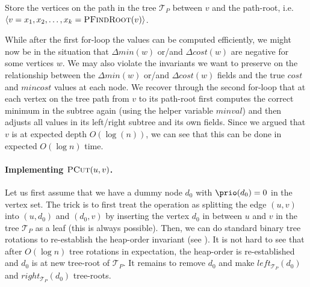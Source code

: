 \begin{algorithm}
  \SetAlgoLined
  \DontPrintSemicolon
  Store the vertices on the path in the tree $\mathcal{T}_{P}$ between $v$ and the path-root, i.e. $\langle v = x_1, x_2, \ldots, x_k = \textsc{PFindRoot}(v)\rangle$.\\
  
  \caption{$\textsc{PAddCost}(v, \Delta)$}
\end{algorithm}

While after the first for-loop the values can be computed efficiently, we might now be in the situation that $\Delta min(w)$ or/and $\Delta cost(w)$ are negative for some vertices $w$. We may also  violate the invariants we want to preserve on the relationship between the $\Delta min(w)$ or/and $\Delta cost(w)$ fields and the true $cost$ and $mincost$ values at each node. We recover through the second for-loop that at each vertex on the tree path from $v$ to its path-root first computes the correct minimum in the subtree again (using the helper variable $\textit{minval}$) and then adjusts all values in its left/right subtree and its own fields. Since we argued that $v$ is at expected depth $O(\log(n))$, we can see that this can be done in expected $O(\log n)$ time.


\paragraph{Implementing $\textsc{PCut}(u,v)$.} Let us first assume that we have a dummy node $d_0$ with $\prio(d_0) = 0$ in the vertex set. The trick is to first treat the operation as splitting the edge $(u,v)$ into $(u,d_0)$ and $(d_0,v)$ by inserting the vertex $d_0$ in between $u$ and $v$ in the tree $\mathcal{T}_{P}$ as a leaf (this is always possible). Then, we can do standard binary tree rotations to re-establish the heap-order invariant (see ). It is not hard to see that after $O(\log n)$ tree rotations in expectation, the heap-order is re-established and $d_0$ is at new tree-root of $\mathcal{T}_{P}$. It remains to remove $d_0$ and make $left_{\mathcal{T}_{P}}(d_0)$ and $right_{\mathcal{T}_{P}}(d_0)$ tree-roots.

